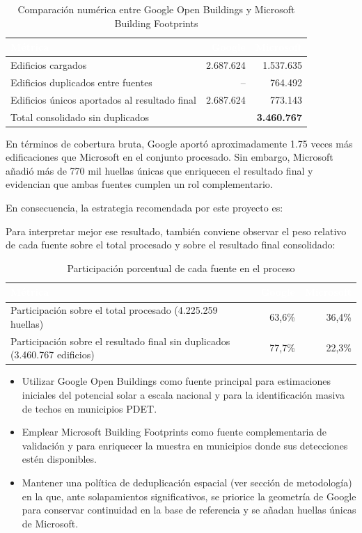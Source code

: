 \documentclass{article}
\newcommand{\tblhdr}[1]{%
  \cellcolor{azulclaro}\textbf{\textcolor{white}{#1}}%
}
\begin{document}
\begin{table}[H]
\centering
\caption{Comparación numérica entre Google Open Buildings y 
Microsoft Building Footprints}
\begin{tabular}{p{6cm} r r}
\toprule
\tblhdr{Métrica} & \tblhdr{Google} & \tblhdr{Microsoft} \\
\midrule
Edificios cargados & 2.687.624 & 1.537.635 \\
\rowcolor{grisfilas}
Edificios duplicados entre fuentes & -- & 764.492 \\
Edificios únicos aportados al resultado final & 2.687.624 & 773.143 \\
\rowcolor{grisfilas}
Total consolidado sin duplicados & \multicolumn{2}{r}{\textbf{3.460.767}} \\
\bottomrule
\end{tabular}
\end{table}

En términos de cobertura bruta, Google aportó aproximadamente 1.75 veces más edificaciones que Microsoft en el conjunto procesado. Sin embargo, Microsoft añadió más de 770 mil huellas únicas que enriquecen el resultado final y evidencian que ambas fuentes cumplen un rol complementario.

En consecuencia, la estrategia recomendada por este proyecto es:

Para interpretar mejor ese resultado, también conviene observar el peso relativo de cada fuente sobre el total procesado y sobre el resultado final consolidado:

\begin{table}[H]
\centering
\caption{Participación porcentual de cada fuente en el proceso}
\begin{tabular}{p{7cm} r r}
\toprule
\tblhdr{Métrica} & \tblhdr{Google} & \tblhdr{Microsoft} \\
\midrule
Participación sobre el total procesado 
(4.225.259 huellas) & 63,6\% & 36,4\% \\
\rowcolor{grisfilas}
Participación sobre el resultado final sin duplicados 
(3.460.767 edificios) & 77,7\% & 22,3\% \\
\bottomrule
\end{tabular}
\end{table}

\begin{itemize}
    \item Utilizar Google Open Buildings como fuente principal para estimaciones iniciales del potencial solar a escala nacional y para la identificación masiva de techos en municipios PDET.
    \item Emplear Microsoft Building Footprints como fuente complementaria de validación y para enriquecer la muestra en municipios donde sus detecciones estén disponibles.
    \item Mantener una política de deduplicación espacial (ver sección de metodología) en la que, ante solapamientos significativos, se priorice la geometría de Google para conservar continuidad en la base de referencia y se añadan huellas únicas de Microsoft.
\end{itemize}
\end{document}
